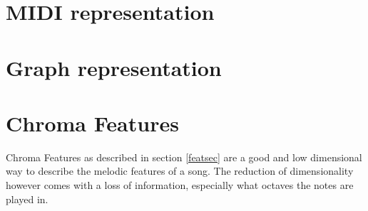 \section{MIDI representation}


\section{Graph representation}

\section{Chroma Features}

Chroma Features as described in section \ref{featsec} are a good and low dimensional way to describe the melodic features of a song. 
The reduction of dimensionality however comes with a loss of information, especially what octaves the notes are played in. 

